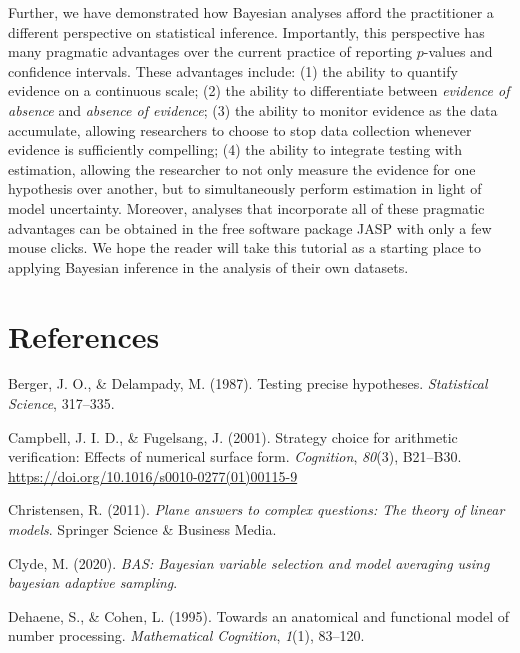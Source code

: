 \documentclass[english,,doc,floatsintext]{apa6}
\begin{document}
Further, we have demonstrated how Bayesian analyses afford the practitioner a different perspective on statistical inference. Importantly, this perspective has many pragmatic advantages over the current practice of reporting \(p\)-values and confidence intervals. These advantages include: (1) the ability to quantify evidence on a continuous scale; (2) the ability to differentiate between \emph{evidence of absence} and \emph{absence of evidence}; (3) the ability to monitor evidence as the data accumulate, allowing researchers to choose to stop data collection whenever evidence is sufficiently compelling; (4) the ability to integrate testing with estimation, allowing the researcher to not only measure the evidence for one hypothesis over another, but to simultaneously perform estimation in light of model uncertainty. Moreover, analyses that incorporate all of these pragmatic advantages can be obtained in the free software package JASP with only a few mouse clicks. We hope the reader will take this tutorial as a starting place to applying Bayesian inference in the analysis of their own datasets.

\newpage

\hypertarget{references}{%
\section{References}\label{references}}

\setlength{\parindent}{-0.5in}
\setlength{\leftskip}{0.5in}

\hypertarget{refs}{}
\leavevmode\hypertarget{ref-berger1987testing}{}%
Berger, J. O., \& Delampady, M. (1987). Testing precise hypotheses. \emph{Statistical Science}, 317--335.

\leavevmode\hypertarget{ref-campbellFugelsang2001}{}%
Campbell, J. I. D., \& Fugelsang, J. (2001). Strategy choice for arithmetic verification: Effects of numerical surface form. \emph{Cognition}, \emph{80}(3), B21--B30. \url{https://doi.org/10.1016/s0010-0277(01)00115-9}

\leavevmode\hypertarget{ref-christensen2011plane}{}%
Christensen, R. (2011). \emph{Plane answers to complex questions: The theory of linear models}. Springer Science \& Business Media.

\leavevmode\hypertarget{ref-bas}{}%
Clyde, M. (2020). \emph{BAS: Bayesian variable selection and model averaging using bayesian adaptive sampling}.

\leavevmode\hypertarget{ref-dehaeneCohen1995}{}%
Dehaene, S., \& Cohen, L. (1995). Towards an anatomical and functional model of number processing. \emph{Mathematical Cognition}, \emph{1}(1), 83--120.
\end{document}
